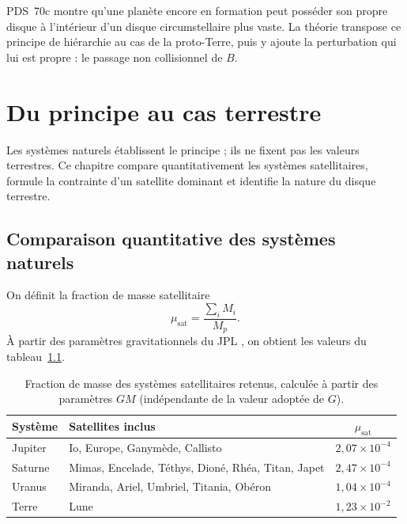 \documentclass[11pt,a4paper,openany]{report}
\begin{document}
\begin{ideephys}
PDS~70c montre qu'une planète encore en formation peut posséder son propre disque à
l'intérieur d'un disque circumstellaire plus vaste. La théorie transpose ce principe de
hiérarchie au cas de la proto-Terre, puis y ajoute la perturbation qui lui est propre : le passage
non collisionnel de $B$.
\end{ideephys}


\chapter{Du principe au cas terrestre}
\label{ch:cas-terrestre}

Les systèmes naturels établissent le principe ; ils ne fixent pas les valeurs terrestres. Ce
chapitre compare quantitativement les systèmes satellitaires, formule la contrainte d'un satellite
dominant et identifie la nature du disque terrestre.

\section{Comparaison quantitative des systèmes naturels}

On définit la fraction de masse satellitaire
\begin{equation}
\mu_{\mathrm{sat}}=\frac{\sum_i M_i}{M_p}.
\label{eq:musat}
\end{equation}
À partir des paramètres gravitationnels du JPL \cite{JPL}, on obtient les valeurs du
tableau~\ref{tab:musat}.

\begin{table}[htbp]
\centering
\caption{Fraction de masse des systèmes satellitaires retenus, calculée à partir des paramètres
$GM$ (indépendante de la valeur adoptée de $G$).}
\label{tab:musat}
\begin{tabular}{llc}
\toprule
\textbf{Système} & \textbf{Satellites inclus} & $\mu_{\mathrm{sat}}$ \\
\midrule
Jupiter & Io, Europe, Ganymède, Callisto & $2{,}07\times10^{-4}$ \\
Saturne & Mimas, Encelade, Téthys, Dioné, Rhéa, Titan, Japet & $2{,}47\times10^{-4}$ \\
Uranus  & Miranda, Ariel, Umbriel, Titania, Obéron & $1{,}04\times10^{-4}$ \\
Terre   & Lune & $1{,}23\times10^{-2}$ \\
\bottomrule
\end{tabular}
\end{table}
\end{document}

